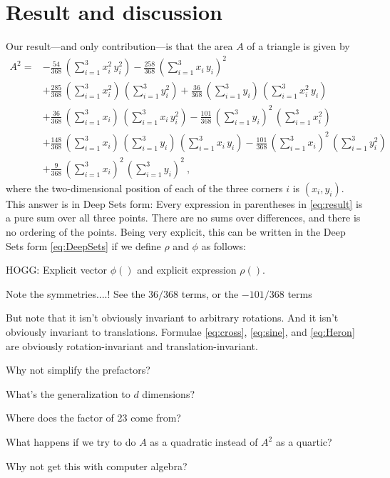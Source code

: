 \documentclass[12pt]{article}
\begin{document}
\section{Result and discussion}\label{sec:result}
Our result---and only contribution---is that the area $A$ of a triangle is given by
\begin{align}
A^2 = &
-\frac{ 54}{368}\,(\sum_{i=1}^3 x_i^2\,y_i^2) 
-\frac{258}{368}\,(\sum_{i=1}^3 x_i\,y_i)^2 \nonumber \\ &
+\frac{285}{368}\,(\sum_{i=1}^3 x_i^2)\,(\sum_{i=1}^3 y_i^2) 
+\frac{ 36}{368}\,(\sum_{i=1}^3 y_i)\,(\sum_{i=1}^3 x_i^2\,y_i) \nonumber \\ &
+\frac{ 36}{368}\,(\sum_{i=1}^3 x_i)\,(\sum_{i=1}^3 x_i\,y_i^2) 
-\frac{101}{368}\,(\sum_{i=1}^3 y_i)^2\,(\sum_{i=1}^3 x_i^2) \nonumber \\ &
+\frac{148}{368}\,(\sum_{i=1}^3 x_i)\,(\sum_{i=1}^3 y_i)\,(\sum_{i=1}^3 x_i\,y_i) 
-\frac{101}{368}\,(\sum_{i=1}^3 x_i)^2\,(\sum_{i=1}^3 y_i^2) \nonumber \\ &
+\frac{  9}{368}\,(\sum_{i=1}^3 x_i)^2\,(\sum_{i=1}^3 y_i)^2 ~, \label{eq:result}
\end{align}
where the two-dimensional position of each of the three corners $i$ is $(x_i, y_i)$.
This answer is in Deep Sets form:
Every expression in parentheses in \eqref{eq:result} is a pure sum over all three points.
There are no sums over differences, and there is no ordering of the points.
Being very explicit, this can be written in the Deep Sets form \eqref{eq:DeepSets} if we define $\rho$ and $\phi$ as follows:

HOGG: Explicit vector $\phi()$ and explicit expression $\rho()$.

Note the symmetries....! See the $36/368$ terms, or the $-101/368$ terms

But note that it isn't obviously invariant to arbitrary rotations.
And it isn't obviously invariant to translations.
Formulae \eqref{eq:cross}, \eqref{eq:sine}, and \eqref{eq:Heron} are obviously rotation-invariant and translation-invariant.

Why not simplify the prefactors?

What's the generalization to $d$ dimensions?

Where does the factor of 23 come from?

What happens if we try to do $A$ as a quadratic instead of $A^2$ as a quartic?

Why not get this with computer algebra?
\end{document}
